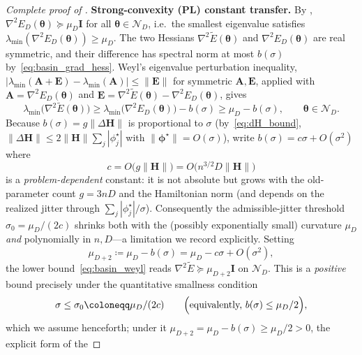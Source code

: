 \documentclass[11pt]{article}
\newcommand{\cN}{\mathcal{N}}
\theoremstyle{plain}
\theoremstyle{plain}
\begin{document}
\begin{proof}[Complete proof of ]
\textbf{Strong-convexity (PL) constant transfer.}  By
, $\nabla^2 E_D(\bm\theta)\succeq\mu_D\mathbf{I}$ for all
$\bm\theta\in\cN_D$, i.e.\ the smallest eigenvalue satisfies
$\lambda_{\min}(\nabla^2 E_D(\bm\theta))\ge\mu_D$.  The two Hessians
$\nabla^2\widetilde{E}(\bm\theta)$ and $\nabla^2 E_D(\bm\theta)$ are
real symmetric, and their difference has spectral norm at most
$b(\sigma)$ by~\eqref{eq:basin_grad_hess}.  Weyl's eigenvalue
perturbation inequality, $|\lambda_{\min}(\mathbf{A}+\mathbf{E})
-\lambda_{\min}(\mathbf{A})|\le\|\mathbf{E}\|$ for symmetric $\mathbf{A},\mathbf{E}$, applied with
$\mathbf{A}=\nabla^2 E_D(\bm\theta)$ and
$\mathbf{E}=\nabla^2\widetilde{E}(\bm\theta)-\nabla^2 E_D(\bm\theta)$, gives
\begin{equation}\label{eq:basin_weyl}
  \lambda_{\min}\bigl(\nabla^2\widetilde{E}(\bm\theta)\bigr)
  \ge\lambda_{\min}\bigl(\nabla^2 E_D(\bm\theta)\bigr)-b(\sigma)
  \ge\mu_D-b(\sigma),
  \qquad\bm\theta\in\cN_D.
\end{equation}
Because $b(\sigma)=g \|\Delta\mathbf{H}\|$ is proportional to $\sigma$
(by~\eqref{eq:dH_bound}, $\|\Delta\mathbf{H}\|\le 2\|\mathbf{H}\|
\sum_{j}|\phi_j^\star|$ with $\|\bm\phi^\star\|=O(\sigma)$), write
$b(\sigma)=c \sigma+O(\sigma^2)$ where
\begin{equation}\label{eq:basin_c_scaling}
  c=O \bigl(g \|\mathbf{H}\|\bigr)=O \bigl(n^{3/2}D \|\mathbf{H}\|\bigr)
\end{equation}
is a \emph{problem-dependent} constant: it is not absolute but grows with
the old-parameter count $g=3nD$ and the Hamiltonian norm (and depends on
the realized jitter through $\sum_j|\phi_j^\star|/\sigma$).  Consequently
the admissible-jitter threshold $\sigma_0=\mu_D/(2c)$ shrinks both with
the (possibly exponentially small) curvature $\mu_D$ \emph{and}
polynomially in $n,D$---a limitation we record explicitly.  Setting
\begin{equation}\label{eq:basin_mu}
  \mu_{D+2}\coloneqq\mu_D-b(\sigma)=\mu_D-c \sigma+O(\sigma^2),
\end{equation}
the lower bound~\eqref{eq:basin_weyl} reads
$\nabla^2\widetilde{E}\succeq\mu_{D+2}\mathbf{I}$ on $\cN_D$.  This is a
\emph{positive} bound precisely under the quantitative smallness
condition
\begin{equation}\label{eq:basin_sigma_threshold}
  \sigma\le\sigma_0\coloneqq\mu_D/(2c)
  \qquad\Bigl(\text{equivalently, }b(\sigma)\le\mu_D/2\Bigr),
\end{equation}
which we assume henceforth; under it
$\mu_{D+2}=\mu_D-b(\sigma)\ge\mu_D/2>0$, the explicit form of the

\end{proof}
\end{document}
